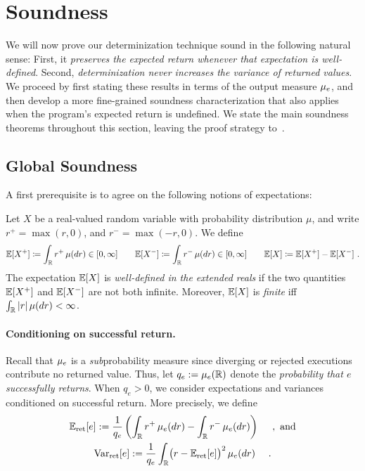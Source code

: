 \section{Soundness}
\label{sec:soundness}

We will now prove our determinization technique sound in the following natural sense: First,
it \emph{preserves the expected return whenever that expectation is well-defined}. Second,
\emph{determinization never increases the variance of returned values}. We proceed by first stating
these results in terms of the output measure $\law e$, and then develop a more fine-grained soundness characterization that also applies when the program's expected return is undefined. We state the main soundness theorems throughout
this section, leaving the proof strategy to~.

\subsection{Global Soundness}

A first prerequisite is to agree on the following notions of expectations:

\begin{definition}
Let $X$ be a real-valued random variable with probability distribution
$\mu$, and write
  $r^+=\max(r,0)$,
  and
  $r^-=\max(-r,0)$.
We define
\[
  \Expect[X^{+}]
  \coloneq \int_{\Real}r^{+}\,\mu(dr)\in[0,\infty]
  \qquad
  \Expect[X^{-}]
  \coloneq \int_{\Real}r^{-}\,\mu(dr)\in[0,\infty]
  \qquad 
  \Expect[X]\coloneqq\Expect[X^+]-\Expect[X^-]~.
\]
The expectation $\Expect[X]$ is \emph{well-defined in the extended reals} if the
two quantities $\Expect[X^{+}]$ and $\Expect[X^{-}]$ are not both infinite. Moreover, $\Expect[X]$ is \emph{finite} iff
$
  \int_{\Real}|r|\,\mu(dr)<\infty
$.
\end{definition}

\paragraph{Conditioning on successful return.}
Recall that $\law e$ is a \emph{sub}probability measure since diverging or
rejected executions contribute no returned value. Thus, let
$
  q_e := \law e(\Real)\leanref{return-probability}
$
denote the \emph{probability that $e$ successfully returns}. When $q_e>0$,
we consider expectations and variances conditioned on successful
return. More precisely, we define
\begin{gather*}
  \Expect_{\mathrm{ret}}[e]
  :=\frac{1}{q_e}
  \left(
    \int_{\Real}r^+\,\law e(dr)
    -\int_{\Real}r^-\,\law e(dr)
  \right)\quad\leanref{returned-expectation}~,~\text{and}
  \\
  \Var_{\mathrm{ret}}[e]
  :=\frac{1}{q_e}
  \int_{\Real}
    \bigl(r-\Expect_{\mathrm{ret}}[e]\bigr)^2
  \,\law e(dr)\quad\leanref{returned-variance}~.
\end{gather*}

